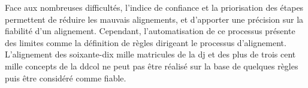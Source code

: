 \bigskip
\bigskip
Face aux nombreuses difficultés, l'indice de confiance et la priorisation des étapes permettent de réduire les mauvais alignements, et d'apporter une précision sur la fiabilité d'un alignement. Cependant, l'automatisation de ce processus présente des limites comme la définition de règles dirigeant le processus d'alignement. L'alignement des soixante-dix mille matricules de la \ac{dj} et des plus de trois cent mille concepts de la \ac{ddcol} ne peut pas être réalisé sur la base de quelques règles puis être considéré comme fiable.